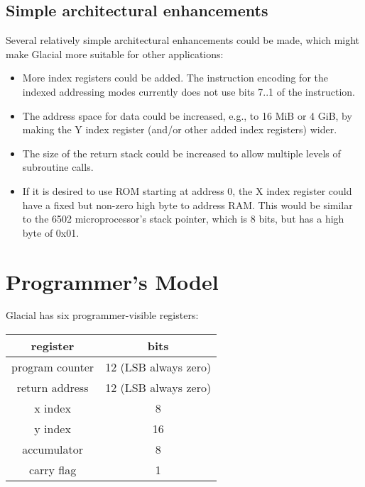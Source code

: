 \documentclass[letterpaper]{report}
\begin{document}
\section{Simple architectural enhancements}

Several relatively simple architectural enhancements could be made,
which might make Glacial more suitable for other applications:

\begin{itemize}

  \item More index registers could be added. The instruction encoding for the
indexed addressing modes currently does not use bits 7..1 of the
instruction.

  \item The address space for data could be increased, e.g., to 16 MiB
or 4 GiB, by making the Y index register (and/or other added index
registers) wider.

  \item The size of the return stack could be increased to allow
multiple levels of subroutine calls.

  \item If it is desired to use ROM starting at address 0, the X index
register could have a fixed but non-zero high byte to address
RAM. This would be similar to the 6502 microprocessor's stack pointer,
which is 8 bits, but has a high byte of 0x01.

\end{itemize}


\chapter{Programmer's Model}

Glacial has six programmer-visible registers:

\bigskip

\begin{tabular}{ | c | c | }
  \hline
  register        & bits \\
  \hline \hline
  program counter & 12 (LSB always zero) \\
  \hline
  return address  & 12 (LSB always zero) \\
  \hline
  x index         & 8 \\
  \hline
  y index         & 16 \\
  \hline
  accumulator     & 8 \\
  \hline
  carry flag      & 1 \\
  \hline
\end{tabular}
\end{document}
